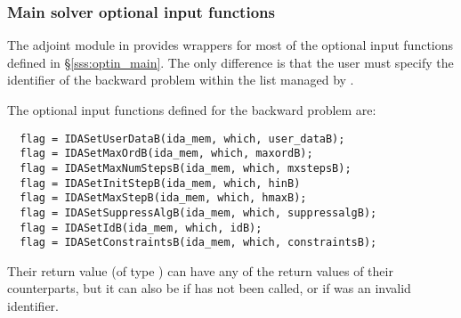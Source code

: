 \subsubsection{Main solver optional input functions}

The adjoint module in {\idas} provides wrappers for most of the optional 
input functions defined in \S\ref{sss:optin_main}. The only difference is 
that the user must specify the identifier  of the backward problem 
within the list managed by {\idas}. 

The optional input functions defined for the backward problem are:
\begin{verbatim}
  flag = IDASetUserDataB(ida_mem, which, user_dataB);
  flag = IDASetMaxOrdB(ida_mem, which, maxordB);
  flag = IDASetMaxNumStepsB(ida_mem, which, mxstepsB);
  flag = IDASetInitStepB(ida_mem, which, hinB)
  flag = IDASetMaxStepB(ida_mem, which, hmaxB);
  flag = IDASetSuppressAlgB(ida_mem, which, suppressalgB);
  flag = IDASetIdB(ida_mem, which, idB);
  flag = IDASetConstraintsB(ida_mem, which, constraintsB);
\end{verbatim}
Their return value  (of type ) can have any of the return values 
of their counterparts, but it can also be  if  
has not been called, or  if  was an invalid identifier. 


